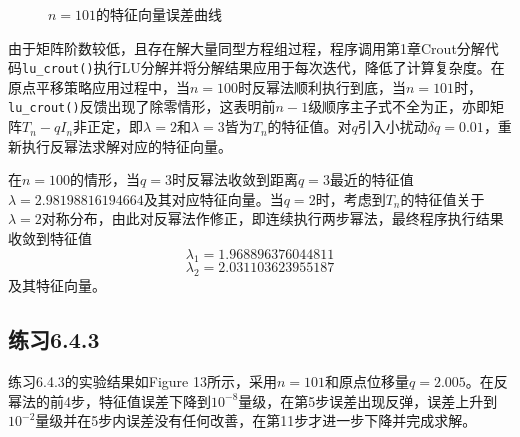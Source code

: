 \documentclass[UTF8,a4paper,10pt]{ctexart}
\begin{document}
        \begin{figure}[htbp]
            \centering
            \caption{$n=101$的特征向量误差曲线}
        \end{figure}
        \par
        由于矩阵阶数较低，且存在解大量同型方程组过程，程序调用第1章Crout分解代码\texttt{lu\_crout()}执行LU分解并将分解结果应用于每次迭代，降低了计算复杂度。在原点平移策略应用过程中，当$n=100$时反幂法顺利执行到底，当$n=101$时，\texttt{lu\_crout()}反馈出现了除零情形，这表明前$n-1$级顺序主子式不全为正，亦即矩阵$T_n-qI_n$非正定，即$\lambda=2$和$\lambda=3$皆为$T_n$的特征值。对$q$引入小扰动$\delta q=0.01$，重新执行反幂法求解对应的特征向量。
        \par
        在$n=100$的情形，当$q=3$时反幂法收敛到距离$q=3$最近的特征值$\lambda=2.98198816194664$及其对应特征向量。当$q=2$时，考虑到$T_n$的特征值关于$\lambda=2$对称分布，由此对反幂法作修正，即连续执行两步幂法，最终程序执行结果收敛到特征值
        $$
        \lambda_1=1.968896376044811
        $$
        $$
        \lambda_2=2.031103623955187
        $$
        及其特征向量。

    \subsection{练习6.4.3}
        \par
        练习6.4.3的实验结果如Figure 13所示，采用$n=101$和原点位移量$q=2.005$。在反幂法的前4步，特征值误差下降到$10^{-8}$量级，在第5步误差出现反弹，误差上升到$10^{-2}$量级并在5步内误差没有任何改善，在第11步才进一步下降并完成求解。
\end{document}
